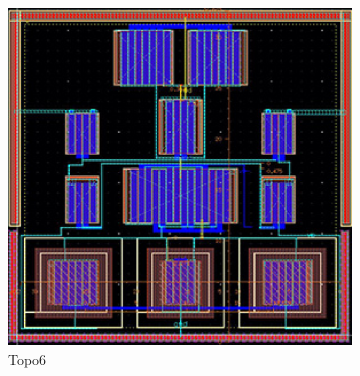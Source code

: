 \begin{figure}[ht]
\begin{subfigure}[t]{0.2\textwidth}
      \includegraphics[width=\textwidth]{Fig/MultTopo_Topo6.eps}
      \caption{Topo6}\label{fig:Topo6}
      \end{subfigure}
      \begin{subfigure}[t]{0.2\textwidth}

\end{subfigure}
\end{figure}

